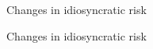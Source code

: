 \documentclass{beamer}
\begin{document}
\begin{frame}{Changes in idiosyncratic risk}

\end{frame}

\begin{frame}{Changes in idiosyncratic risk}



\end{frame}
\end{document}
